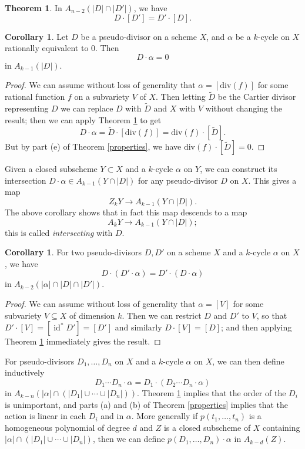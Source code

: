 \documentclass[12pt]{article}
\theoremstyle{definition}
\theoremstyle{theorem}
\newtheorem{thm}[defn]{Theorem}
\newtheorem{cor}[defn]{Corollary}
\newcommand{\1}{\mathbbm 1}
\renewcommand{\div}{\text{div}}
\DeclareMathOperator{\id}{id}
\begin{document}
\begin{thm} \label{commutativity}
In $A_{n-2}(|D| \cap |D'|)$, we have \[ D \cdot [D'] = D' \cdot [D] . \]
\end{thm}

\begin{cor} \label{preserving}
Let $D$ be a pseudo-divisor on a scheme $X$, and $\alpha$ be a $k$-cycle on $X$ rationally equivalent to $0$. Then \[ D \cdot \alpha = 0 \] in $A_{k-1} (|D|)$.
\end{cor}
\begin{proof}
We can assume without loss of generality that $\alpha = [\div (f)]$ for some rational function $f$ on a subvariety $V$ of $X$. Then letting $\tilde D$ be the Cartier divisor representing $D$ we can replace $D$ with $\tilde D$ and $X$ with $V$ without changing the result; then we can apply Theorem \ref{commutativity} to get \[ D \cdot \alpha = \tilde D \cdot [\div (f)] = \div (f) \cdot [\tilde D] . \] But by part (e) of Theorem \ref{properties}, we have $\div (f) \cdot [\tilde D] = 0$.
\end{proof}

Given a closed subscheme $Y \subset X$ and a $k$-cycle $\alpha$ on $Y$, we can construct its intersection $D \cdot \alpha \in A_{k-1}(Y \cap |D|)$ for any pseudo-divisor $D$ on $X$. This gives a map \[ Z_k Y \to A_{k-1}(Y \cap |D|) . \] The above corollary shows that in fact this map descends to a map \[ A_k Y \to A_{k-1} (Y \cap |D|) ; \] this is called {\em intersecting} with $D$.

\begin{cor}
For two pseudo-divisors $D, D'$ on a scheme $X$ and a $k$-cycle $\alpha$ on $X$, we have \[ D \cdot (D' \cdot \alpha) = D' \cdot (D \cdot \alpha) \] in $A_{k-2}(|\alpha| \cap |D| \cap |D'|)$.
\end{cor}
\begin{proof}
We can assume without loss of generality that $\alpha = [V]$ for some subvariety $V \subseteq X$ of dimension $k$. Then we can restrict $D$ and $D'$ to $V$, so that $D' \cdot [V] = [\id^* D'] = [D']$ and similarly $D \cdot [V] = [D]$; and then applying Theorem \ref{commutativity} immediately gives the result.
\end{proof}

For pseudo-divisors $D_1, \ldots, D_n$ on $X$ and a $k$-cycle $\alpha$ on $X$, we can then define inductively \[ D_1 \cdots D_n \cdot \alpha = D_1 \cdot (D_2 \cdots D_n \cdot \alpha) \] in $A_{k-n} (|\alpha| \cap (|D_1| \cup \cdots \cup |D_n|))$. Theorem \ref{commutativity} implies that the order of the $D_i$ is unimportant, and parts (a) and (b) of Theorem \ref{properties} implies that the action is linear in each $D_i$ and in $\alpha$. More generally if $p(t_1, \ldots, t_n)$ is a homogeneous polynomial of degree $d$ and $Z$ is a closed subscheme of $X$ containing $|\alpha| \cap (|D_1| \cup \cdots \cup |D_n|)$, then we can define $p(D_1, \ldots, D_n) \cdot \alpha$ in $A_{k-d}(Z)$.
\end{document}
